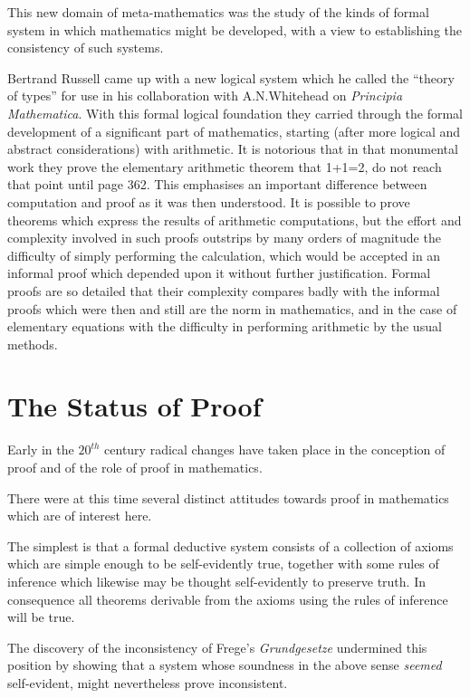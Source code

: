 This new domain of meta-mathematics was the study of the kinds of
formal system in which mathematics might be developed, with a view to
establishing the consistency of such systems.

Bertrand Russell came up with a new logical system which he called the
``theory of types'' for use in his collaboration with A.N.Whitehead on
\emph{Principia Mathematica}.
With this formal logical foundation they carried through the
formal development of a significant part of mathematics, starting
(after more logical and abstract considerations) with arithmetic.
It is notorious that in that monumental work they prove the elementary
arithmetic theorem that 1+1=2, do not reach that point until page 362.
This emphasises an important difference between computation and proof
as it was then understood.
It is possible to prove theorems which express the results of
arithmetic computations, but the effort and complexity involved in
such proofs outstrips by many orders of magnitude the difficulty of
simply performing the calculation, which would be accepted in an
informal proof which depended upon it without further justification.
Formal proofs are so detailed that their complexity compares badly
with the informal proofs which were then and still are the norm in
mathematics, and in the case of elementary equations with the
difficulty in performing arithmetic by the usual methods.

\section{The Status of Proof}

Early in the $20^{th}$ century radical changes have taken place in the
conception of proof and of the role of proof in mathematics.

There were at this time several distinct attitudes towards proof in
mathematics which are of interest here.

The simplest is that a formal deductive system consists of a
collection of axioms which are simple enough to be self-evidently
true, together with some rules of inference which likewise may be
thought self-evidently to preserve truth.
In consequence all theorems derivable from the axioms using the rules
of inference will be true.

The discovery of the inconsistency of Frege's \emph{Grundgesetze}
undermined this position by showing that a system whose soundness in
the above sense \emph{seemed} self-evident, might nevertheless prove
inconsistent.

